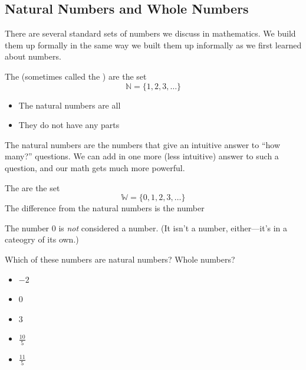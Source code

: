\subsection{Natural Numbers and Whole Numbers} 
There are several standard sets of numbers we discuss in mathematics. We build them up formally in the same way we built them up informally as we first learned about numbers.
\begin{definition}
The  (sometimes called the ) are the set
\[
\mathbb{N}=\{1,2,3,\dots\}
\]
\end{definition}
\begin{itemize}
\item The natural numbers are all \makeblank
\item They do not have any \makeblank parts
\end{itemize}
The natural numbers are the numbers that give an intuitive answer to ``how many?'' questions. We can add in one more (less intuitive) answer to such a question, and our math gets much more powerful.
\begin{definition}
The  are the set
\[
\mathbb{W}=\{0,1,2,3,\dots\}
\]
The difference from the natural numbers is the number \makeblanksmall
\end{definition}
\begin{Note}
The number $0$ is \emph{not} considered a \makeblank number. (It isn't a \makeblank number, either---it's in a cateogry of its own.)
\end{Note}
\begin{Example}
Which of these numbers are natural numbers? Whole numbers?
\begin{itemize}
\item $-2$  
\makeblanknew
\item $0$  
\makeblanknew
\item $3$  
\makeblanknew
\item $\frac{10}{5}$  
\makeblanknew
\item $\frac{11}{5}$  
\makeblanknew
\end{itemize}
\end{Example}